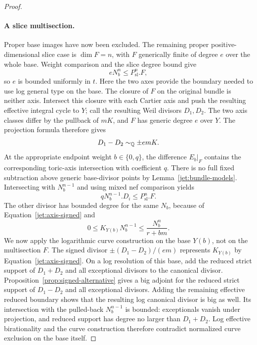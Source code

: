 \begin{proof}
\paragraph{A slice multisection.}
Proper base images have now been excluded.  The remaining proper
positive-dimensional slice case is
\(\dim F=n\), with \(F\) generically finite of degree \(e\) over
the whole base.  Weight comparison and the slice degree bound give
\[
 eN_b^n\le P_{\mathrm{sl}}^n.F,
\]
so \(e\) is bounded uniformly in \(t\).
Here the two axes provide the boundary needed to use log general
type on the base.  The closure of \(F\) on the original bundle is
neither axis.
Intersect this closure with each Cartier axis and push the resulting
effective integral cycle to \(Y\); call the resulting Weil divisors
\(D_1,D_2\). The two axis classes differ by the pullback of \(mK\),
and \(F\) has generic degree \(e\) over \(Y\). The projection formula
therefore gives
\begin{equation}\label{jet:axis-signed}
 D_1-D_2\sim_{\mathbb{Q}} \pm emK.
\end{equation}
At the appropriate endpoint weight \(b\in\{0,q\}\), the difference
\(E_b|_F\) contains the corresponding toric-axis intersection with
coefficient \(q\).  There is no full fixed subtraction above
generic base-divisor points by Lemma~\ref{jet:bundle-models}.
Intersecting with \(N_b^{n-1}\) and using mixed nef comparison yields
\[
 qN_b^{n-1}.D_i\le P_{\mathrm{sl}}^n.F.
\]
The other divisor has bounded degree for the same \(N_b\), because
of Equation~\eqref{jet:axis-signed} and
\[
 0\le K_{Y(b)}N_b^{n-1}\le\frac{N_b^n}{r+bm}.
\]
We now apply the logarithmic curve construction on the base \(Y(b)\),
not on the multisection \(F\). The signed divisor
\(\pm(D_1-D_2)/(em)\) represents \(K_{Y(b)}\) by
Equation~\eqref{jet:axis-signed}. On a log resolution of this base, add
the reduced strict support of \(D_1+D_2\) and all exceptional divisors
to the canonical divisor. Proposition~\ref{prop:signed-alternative}
gives a big adjoint for the reduced strict support of \(D_1-D_2\) and
all exceptional divisors. Adding the remaining effective reduced boundary
shows that the resulting log canonical divisor is big as well.
Its intersection with the pulled-back \(N_b^{n-1}\) is bounded:
exceptionals vanish under projection, and reduced support has
degree no larger than \(D_1+D_2\).
Log effective birationality and the curve construction therefore
contradict normalized curve exclusion on the base itself.


\end{proof}
